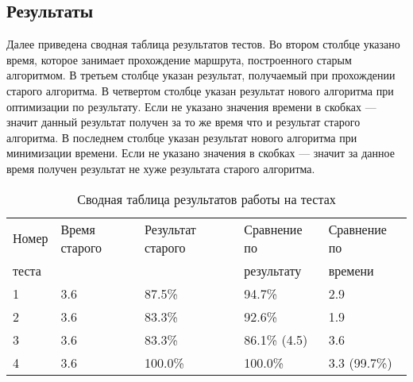 \FloatBarrier

\subsection{Результаты}
Далее приведена сводная таблица результатов тестов. Во втором столбце указано время,
которое занимает прохождение маршрута, построенного старым алгоритмом. В третьем столбце указан
результат, получаемый при прохождении старого алгоритма. В четвертом столбце указан
результат нового алгоритма при оптимизации по результату. Если не указано значения времени
в скобках --- значит данный результат получен за то же время что и результат старого алгоритма.
В последнем столбце указан результат нового алгоритма при минимизации времени. Если не указано
значения в скобках --- значит за данное время получен результат не хуже результата старого
алгоритма.

\begin{table}[ht]
  \centering
  \begin{tabular}{|l|l|l|l|l|}
\hline
    Номер & Время старого & Результат старого & Сравнение по & Сравнение по \\
    теста     & & & результату & времени \\
\hline
    1 & 3.6 & 87.5\% & 94.7\% & 2.9 \\ 
    2 & 3.6 & 83.3\% & 92.6\% & 1.9 \\
    3 & 3.6 & 83.3\% & 86.1\% (4.5) & 3.6 \\
    4 & 3.6 & 100.0\%& 100.0\%& 3.3 (99.7\%) \\
\hline

  \end{tabular}
  \captionsetup{justification=centering}
  \caption{Сводная таблица результатов работы на тестах}
  \label{results}
\end{table}

\FloatBarrier